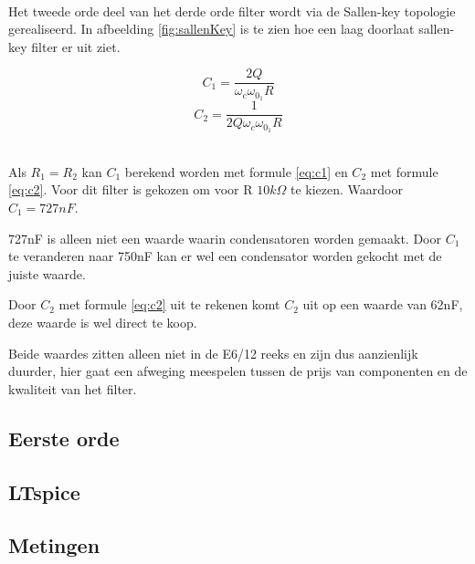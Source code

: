 \vphantom{-}\\
\begin{minipage}{0.37\textwidth}
	Het tweede orde deel van het derde orde filter wordt via de Sallen-key topologie gerealiseerd. In afbeelding \ref{fig:sallenKey} is te zien 
	hoe een laag doorlaat sallen-key filter er uit ziet.
\end{minipage}
\hfill
\begin{minipage}{0.37\textwidth}
	\begin{equation} \label{eq:c1}
		C_1=\frac{2Q}{\omega_c\omega_{0_1}R}
	\end{equation}
	\begin{equation} \label{eq:c2}
		C_2=\frac{1}{2Q\omega_c\omega_{0_1}R}
	\end{equation}
\end{minipage}
\vphantom{-}\\

\noindent
Als $R_1 = R_2$ kan $C_1$ berekend worden met formule \ref{eq:c1} en $C_2$ met formule \ref{eq:c2}.
Voor dit filter is gekozen om voor R $10k\Omega$ te kiezen. Waardoor $C_1=727nF$.

\noindent
727nF is alleen niet een waarde waarin condensatoren worden gemaakt. Door $C_1$ te veranderen naar 750nF 
kan er wel een condensator worden gekocht met de juiste waarde. 

\noindent
Door $C_2$ met formule \ref{eq:c2} uit te rekenen komt $C_2$ uit op een waarde van 62nF, deze waarde is wel direct 
te koop. 

\noindent
Beide waardes zitten alleen niet in de E6/12 reeks en zijn dus aanzienlijk duurder, 
hier gaat een afweging meespelen tussen de prijs van componenten en de kwaliteit van het filter.

\subsection{Eerste orde}

\subsection{LTspice}

\subsection{Metingen}
